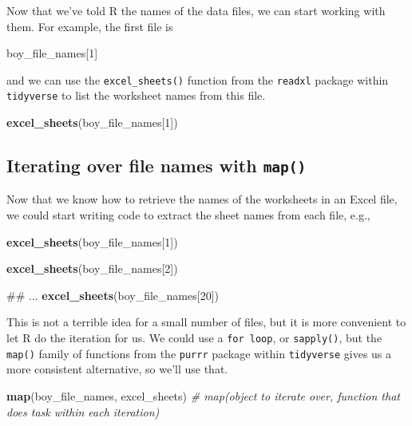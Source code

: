 \documentclass[]{book}
\newenvironment{Shaded}{\begin{snugshade}}{\end{snugshade}}
\newcommand{\KeywordTok}[1]{\textcolor[rgb]{0.13,0.29,0.53}{\textbf{#1}}}
\newcommand{\DecValTok}[1]{\textcolor[rgb]{0.00,0.00,0.81}{#1}}
\newcommand{\CommentTok}[1]{\textcolor[rgb]{0.56,0.35,0.01}{\textit{#1}}}
\newcommand{\NormalTok}[1]{#1}
\begin{document}
Now that we've told R the names of the data files, we can start working
with them. For example, the first file is

\begin{Shaded}
\begin{Highlighting}[]
\NormalTok{boy_file_names[}\DecValTok{1}\NormalTok{]}
\end{Highlighting}
\end{Shaded}

and we can use the \texttt{excel\_sheets()} function from the
\texttt{readxl} package within \texttt{tidyverse} to list the worksheet
names from this file.

\begin{Shaded}
\begin{Highlighting}[]
\KeywordTok{excel_sheets}\NormalTok{(boy_file_names[}\DecValTok{1}\NormalTok{])}
\end{Highlighting}
\end{Shaded}

\subsection{\texorpdfstring{Iterating over file names with
\texttt{map()}}{Iterating over file names with map()}}\label{iterating-over-file-names-with-map}

Now that we know how to retrieve the names of the worksheets in an Excel
file, we could start writing code to extract the sheet names from each
file, e.g.,

\begin{Shaded}
\begin{Highlighting}[]
\KeywordTok{excel_sheets}\NormalTok{(boy_file_names[}\DecValTok{1}\NormalTok{])}

\KeywordTok{excel_sheets}\NormalTok{(boy_file_names[}\DecValTok{2}\NormalTok{])}

\NormalTok{## ...}
\KeywordTok{excel_sheets}\NormalTok{(boy_file_names[}\DecValTok{20}\NormalTok{])}
\end{Highlighting}
\end{Shaded}

This is not a terrible idea for a small number of files, but it is more
convenient to let R do the iteration for us. We could use a
\texttt{for\ loop}, or \texttt{sapply()}, but the \texttt{map()} family
of functions from the \texttt{purrr} package within \texttt{tidyverse}
gives us a more consistent alternative, so we'll use that.

\begin{Shaded}
\begin{Highlighting}[]
\KeywordTok{map}\NormalTok{(boy_file_names, excel_sheets)}
\CommentTok{# map(object to iterate over, function that does task within each iteration)}
\end{Highlighting}
\end{Shaded}
\end{document}
